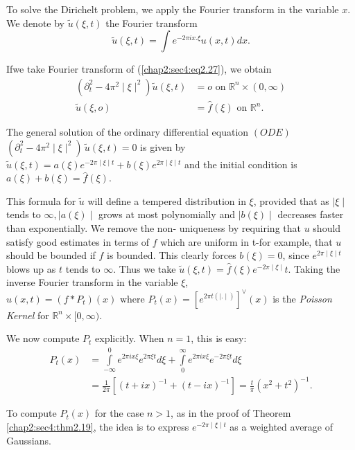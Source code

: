  To solve the Dirichelt problem, we apply the Fourier transform in the
 variable $x$. We denote by $\tilde{u}(\xi, t)$ the Fourier transform  
 $$
 \tilde {u}(\xi, t)=\int e^{-2\pi ix.\xi} u(x,t)dx.
 $$ 
 
 If\pageoriginale we take Fourier transform of
 (\ref{chap2:sec4:eq2.27}), we obtain 
 \begin{align*}
   (\partial^2_t - 4\pi ^2\mid \xi \mid ^2 ) \tilde {u}(\xi, t ) &= o
   \text { on } \mathbb{R}^n \times (0, \infty)\\ 
   \tilde {u} (\xi, o) &= \hat{ f } (\xi) \text { on } \mathbb{R}^n.
 \end{align*} 
 
 
 The general solution of the ordinary differential equation $(ODE)$
 $(\partial ^2_t - 4\pi ^2 \mid \xi \mid ^2)\, \tilde {u} (\xi, t) =0$ is
 given by $\tilde{u}(\xi, t)= a (\xi) e^{-2\pi \mid \xi \mid t}+ b(\xi)
 e^{2\pi \mid \xi\mid t}$ and the initial condition is
 $a(\xi)+b(\xi)=\hat{f}(\xi)$. 
 
 This formula for $\tilde{u}$ will define a tempered distribution in
 $\xi$, provided that as $\mid \xi \mid $ tends to $\infty, \mid a
 (\xi) \mid$ grows at most polynomially and $\mid b(\xi)\mid$
 decreases faster than exponentially. We remove the non- uniqueness by
 requiring that $u$ should satisfy good estimates in terms of $f$
 which are uniform in t-for example, that $u$ should be bounded if $f$
 is bounded. This clearly forces $b(\xi)=0$, since $e^{2\pi \mid \xi
   \mid t}$ blows up as $t$ tends to $\infty$. Thus we take $\tilde
 {u}(\xi, t )= \hat{f}(\xi) e^{-2\pi \mid \xi \mid }t$. Taking the
 inverse Fourier transform in the variable $\xi$, $u(x,t) = (f*P_t)(x)
 \text { where } P_t(x) = [e^{2\pi t (\mid. \mid )}]^\vee (x)$ is the
 \textit{Poisson Kernel } for $\mathbb{R}^n \times [0, \infty)$. 
 
 We now compute $P_t$ explicitly. When $n=1$, this is easy:
 \begin{align*}
  P_t(x)&=\int\limits^{0}_{-\infty}e^{2\pi ix\xi } e^{2\pi \xi t} d\xi
  + \int\limits^{\infty}_{0} e^{2\pi ix \xi } e^{-2\pi \xi t } d\xi\\ 
  &= \frac{1}{2\pi} [(t+ix)^{-1}+ (t-ix )^{-1}] = \frac{t}{\pi} (x^2+t^2)^{-1}.
  \end{align*}

 To compute $P_t(x)$ for the case $n >1$, as in the proof of Theorem
 \ref{chap2:sec4:thm2.19}, the idea is to express $e^{-2\pi \mid \xi \mid t}$ as a
 weighted average of Gaussians. 
 
